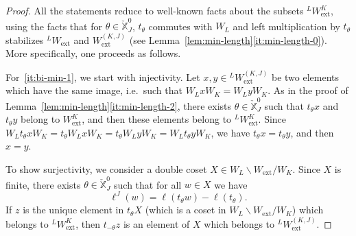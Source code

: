 \documentclass[11pt]{amsart}
\numberwithin{equation}{section}
\theoremstyle{plain}
\theoremstyle{definition}
\newcommand{\X}{{\mathbb X}}
\newcommand{\Xd}{\check{\X}}
\newcommand{\Phis}{\Phi^{\mathrm{s}}}
\newcommand{\ex}{\mathrm{ext}}
\newcommand{\comp}{\mathrm{c}}
\begin{document}
\begin{proof}
All the statements reduce to well-known facts about the subsets ${}^{L} W_\ex^K$, using the facts that for $\theta \in \Xd_J^0$, $t_\theta$ commutes with $W_{L}$ and 
left multiplication by $t_\theta$ stabilizes 
${}^{L}W_\ex$ and
$W_\ex^{(K,J)}$ (see Lemma~\ref{lem:min-length}\eqref{it:min-length-0}). More specifically, one proceeds as follows.

For~\eqref{it:bi-min-1}, we start with injectivity.
Let $x,y\in {}^{L}W_\ex^{(K,J)}$ be two elements which have the same image, i.e.~such that $W_{L} x W_K = W_{L} y W_K$. 
As in the proof of Lemma~\ref{lem:min-length}\eqref{it:min-length-2}, there exists $\theta \in \Xd_J^0$ 
such that $t_\theta x$ and $t_\theta y$ belong to $W_\ex^{K}$, and then these elements belong to ${}^{L} W_\ex^{K}$. Since $W_{L} t_\theta x W_K = t_\theta W_{L} x W_K = t_\theta W_{L} y W_K = W_{L} t_\theta y W_K$, we have $t_\theta x=t_\theta y$, and then $x=y$.

To show surjectivity, we consider a double coset $X \in W_{L} \backslash W_\ex /W_K$.
Since $X$ is finite, there exists $\theta \in \Xd_J^0$ such that for all $w \in X$ we have
\[
\ell^J( w) = \ell(t_\theta w) - \ell(t_\theta).
\]
If $z$ is the unique element in $t_\theta X$ (which is a coset in $W_{L}\backslash W_\ex /W_K$) which belongs to ${}^{L} W_\ex^{K}$, then $t_{-\theta} z$ is an element of $X$ which belongs to ${}^{L} W_\ex^{(K,J)}$.



\end{proof}
\end{document}
